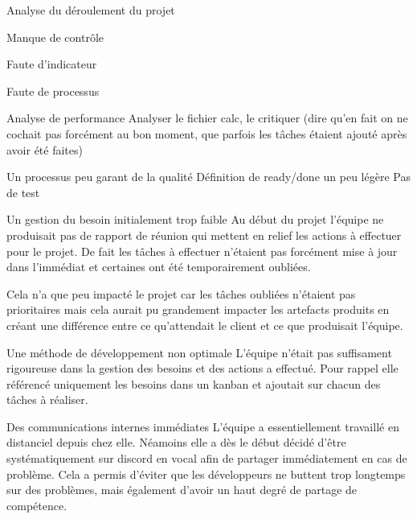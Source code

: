 \documentclass[]{article}
\begin{document}
{\begin{section}{Analyse du déroulement du projet}
    \begin{subsection}{Manque de contrôle}
        \begin{subsubsection}{Faute d'indicateur}
        
        \end{subsubsection}

        \begin{subsubsection}{Faute de processus}
        
        \end{subsubsection}
    \end{subsection}

    \begin{subsection}{Analyse de performance}
        Analyser le fichier calc, le critiquer (dire qu'en fait on ne cochait pas forcément au bon moment, que parfois les tâches étaient ajouté après avoir été faites)
    \end{subsection}

    \begin{subsection}{Un processus peu garant de la qualité}
        Définition de ready/done un peu légère
        Pas de test
    \end{subsection}

    \begin{subsection}{Un gestion du besoin initialement trop faible}
        Au début du projet l'équipe ne produisait pas de rapport de réunion qui mettent en relief les actions à effectuer pour le projet. De fait les tâches à effectuer n'étaient pas forcément mise à jour dans l'immédiat et certaines ont été temporairement oubliées. 
        
        Cela n'a que peu impacté le projet car les tâches oubliées n'étaient pas prioritaires mais cela aurait pu grandement impacter les artefacts produits en créant une différence entre ce qu'attendait le client et ce que produisait l'équipe.
    \end{subsection}

    \begin{subsection}{Une méthode de développement non optimale}
        L'équipe n'était pas suffisament rigoureuse dans la gestion des besoins et des actions a effectué. Pour rappel elle référencé uniquement les besoins dans un kanban et ajoutait sur chacun des tâches à réaliser.
    \end{subsection}

    \begin{subsection}{Des communications internes immédiates}
        L'équipe a essentiellement travaillé en distanciel depuis chez elle. Néamoins elle a dès le début décidé d'être systématiquement sur discord en vocal afin de partager immédiatement en cas de problème. Cela a permis d'éviter que les développeurs ne buttent trop longtemps sur des problèmes, mais également d'avoir un haut degré de partage de compétence.
    \end{subsection}
\end{section}

}
\end{document}
